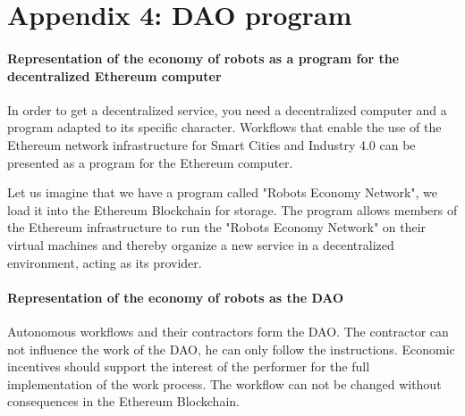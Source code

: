 \documentclass{article}
\begin{document}
\section*{Appendix 4: DAO program}

\paragraph{Representation of the economy of robots as a program for the decentralized Ethereum computer}

In order to get a decentralized service, you need a decentralized computer and a program adapted to its specific character. Workflows that enable the use of the Ethereum network infrastructure for Smart Cities and Industry 4.0 can be presented as a program for the Ethereum computer.

Let us imagine that we have a program called "Robots Economy Network", we load it into the Ethereum Blockchain for storage. The program allows members of the Ethereum infrastructure to run the "Robots Economy Network" on their virtual machines and thereby organize a new service in a decentralized environment, acting as its provider.

\paragraph{Representation of the economy of robots as the DAO}

Autonomous workflows and their contractors form the DAO. The contractor can not influence the work of the DAO, he can only follow the instructions. Economic incentives should support the interest of the performer for the full implementation of the work process. The workflow can not be changed without consequences in the Ethereum Blockchain.
\end{document}
